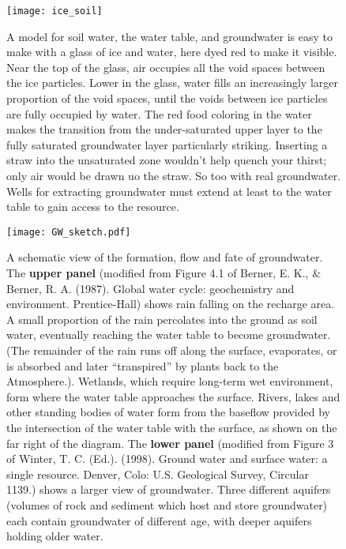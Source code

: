 {\newpage
\begin{figure}[p]
\centering
  \texttt{[image: ice\_soil]}%
\caption{A model for soil water, the water table, and groundwater is easy to make with a glass of ice and water, here dyed red to make it visible. Near the top of the glass, air occupies all the void spaces between the ice particles. Lower in the glass, water fills an increasingly larger proportion of the void spaces, until the voids between ice particles are fully occupied by water. The red food coloring in the water makes the transition from the under-saturated upper layer to the fully saturated groundwater layer particularly striking. Inserting a straw into the unsaturated zone wouldn't help quench your thirst; only air would be drawn uo the straw. So too with real groundwater. Wells for extracting groundwater must extend at least to the water table to gain access to the resource. }
\label{fig:ice_soil}
\end{figure}

\newpage
\begin{figure}[p]
\centering
\texttt{[image: GW\_sketch.pdf]}%
\caption{A schematic view of the formation, flow and fate of groundwater. The \textbf{upper panel} (modified from Figure 4.1 of Berner, E. K., \& Berner, R. A. (1987). Global water cycle: geochemistry and environment. Prentice-Hall) shows rain falling on the recharge area. A small proportion of the rain percolates into the ground as soil water, eventually reaching the water table to become groundwater. (The remainder of the rain runs off along the surface, evaporates, or is absorbed and later ``transpired'' by plants back to the Atmosphere.). Wetlands, which require long-term wet environment, form where the water table approaches the surface. Rivers, lakes and other standing bodies of water form from the baseflow provided by the intersection of the water table with the surface, as shown on the far right of the diagram. The \textbf{lower panel} (modified from Figure 3 of Winter, T. C. (Ed.). (1998). Ground water and surface water: a single resource. Denver, Colo: U.S. Geological Survey, Circular 1139.) shows a larger view of groundwater. Three different aquifers (volumes of rock and sediment which host and store groundwater) each contain groundwater of different age, with deeper aquifers holding older water.}
\label{fig:gw_sketch}
\end{figure}

}
